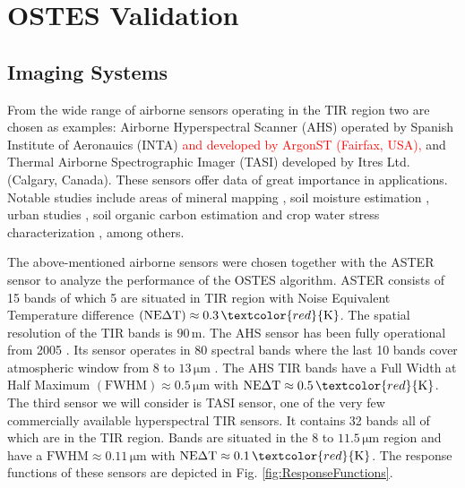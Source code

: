 \chapter{OSTES Validation}
\label{chap:OSTESValid}

\section{Imaging Systems}

From the wide range of airborne sensors operating in the TIR region two are chosen as examples: Airborne Hyperspectral Scanner (AHS) operated by Spanish Institute of Aeronauics (INTA) \textcolor{red}{and developed by ArgonST (Fairfax, USA),} and Thermal Airborne Spectrographic Imager (TASI) developed by Itres Ltd. (Calgary, Canada). These sensors offer data of great importance in applications. Notable studies include areas of
mineral mapping \cite{NK14}, 
soil moisture estimation \cite{SF12}, 
urban studies \cite{SO12},
soil organic carbon estimation \cite{PC14} and
crop water stress characterization \cite{PP12},
among others.

 {The above-mentioned airborne sensors were chosen together with the ASTER sensor to analyze the performance of the OSTES algorithm.
ASTER consists of 15 bands of which 5 are situated in TIR region with Noise Equivalent Temperature difference $\mathrm{(NE\Delta T)} \approx 0.3\,\textcolor{red}{\mathrm{K}}$. The spatial resolution of the TIR bands is $90\,\mathrm{m}$.}
The AHS sensor has been fully operational from 2005 \cite{FM05}. Its sensor operates in 80 spectral bands where the last 10 bands cover atmospheric window from 8 to $13\,\mathrm{\mu m}$ \cite{sobrino_land_2006}. The AHS TIR bands have a  {Full Width at Half Maximum} $\mathrm{(FWHM)} \approx 0.5\,\mathrm{\mu m}$ with $\mathrm{NE\Delta T} \approx 0.5\,\textcolor{red}{\mathrm{K}}$.
 {The third sensor we will consider is TASI sensor,} one of the very few commercially available hyperspectral TIR sensors. It contains 32 bands all of which are in the TIR region. Bands are situated in the 8 to $11.5\,\mathrm{\mu m}$ region and have a $\mathrm{FWHM} \approx 0.11\,\mathrm{\mu m}$ with $\mathrm{NE\Delta T} \approx 0.1\,\textcolor{red}{\mathrm{K}}$. The response functions of these sensors are depicted in Fig. \ref{fig:ResponseFunctions}.

